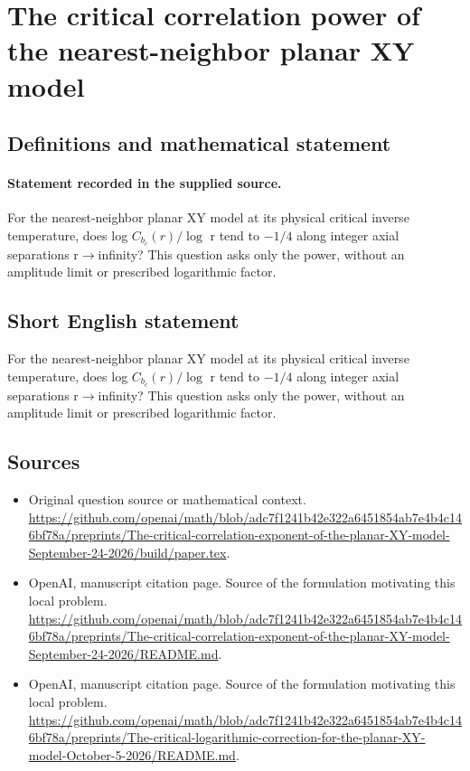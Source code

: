 \documentclass[11pt]{article}
\begin{document}
\section*{The critical correlation power of the nearest-neighbor planar XY model}\label{30007417}
\subsection{Definitions and mathematical statement}
\paragraph{Statement recorded in the supplied source.}
For the nearest-neighbor planar XY model at its physical critical inverse temperature, does log $C_{b_c}(r)/\log $ r tend to $-1/4$ along integer axial separations r$\to$infinity? This question asks only the power, without an amplitude limit or prescribed logarithmic factor.
\subsection{Short English statement}
For the nearest-neighbor planar XY model at its physical critical inverse temperature, does log $C_{b_c}(r)/\log $ r tend to $-1/4$ along integer axial separations r$\to$infinity? This question asks only the power, without an amplitude limit or prescribed logarithmic factor.
\subsection{Sources}
\begin{itemize}
\item[S1] Original question source or mathematical context.
\url{https://github.com/openai/math/blob/adc7f1241b42e322a6451854ab7e4b4c146bf78a/preprints/The-critical-correlation-exponent-of-the-planar-XY-model-September-24-2026/build/paper.tex}.
\item[S2] OpenAI, manuscript citation page. Source of the formulation motivating this local problem.
\url{https://github.com/openai/math/blob/adc7f1241b42e322a6451854ab7e4b4c146bf78a/preprints/The-critical-correlation-exponent-of-the-planar-XY-model-September-24-2026/README.md}.
\item[S3] OpenAI, manuscript citation page. Source of the formulation motivating this local problem.
\url{https://github.com/openai/math/blob/adc7f1241b42e322a6451854ab7e4b4c146bf78a/preprints/The-critical-logarithmic-correction-for-the-planar-XY-model-October-5-2026/README.md}.
\end{itemize}
\end{document}
